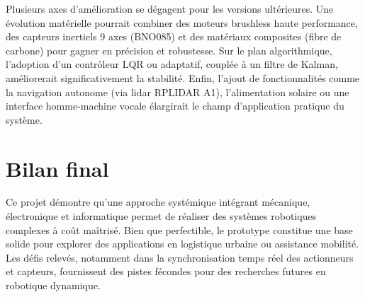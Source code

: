 \documentclass{report}
\begin{document}
Plusieurs axes d'amélioration se dégagent pour les versions ultérieures. Une évolution matérielle pourrait combiner des moteurs brushless haute performance, des capteurs inertiels 9 axes (BNO085) et des matériaux composites (fibre de carbone) pour gagner en précision et robustesse. Sur le plan algorithmique, l'adoption d'un contrôleur LQR ou adaptatif, couplée à un filtre de Kalman, améliorerait significativement la stabilité. Enfin, l'ajout de fonctionnalités comme la navigation autonome (via lidar RPLIDAR A1), l'alimentation solaire ou une interface homme-machine vocale élargirait le champ d'application pratique du système.


\section*{Bilan final}

Ce projet démontre qu'une approche systémique intégrant mécanique, électronique et informatique permet de réaliser des systèmes robotiques complexes à coût maîtrisé. Bien que perfectible, le prototype constitue une base solide pour explorer des applications en logistique urbaine ou assistance mobilité. Les défis relevés, notamment dans la synchronisation temps réel des actionneurs et capteurs, fournissent des pistes fécondes pour des recherches futures en robotique dynamique.
\end{document}
